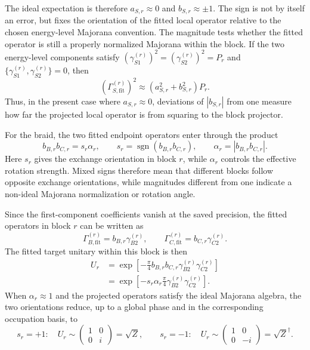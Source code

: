 The ideal expectation is therefore \(a_{S,r}\approx0\) and
\(b_{S,r}\approx\pm1\). The sign is not by itself an error, but fixes the
orientation of the fitted local operator relative to the chosen energy-level
Majorana convention. The magnitude tests whether the fitted operator is still a
properly normalized Majorana within the block. If the two energy-level
components satisfy
\((\gamma_{S1}^{(r)})^2=(\gamma_{S2}^{(r)})^2=P_r\) and
\(\{\gamma_{S1}^{(r)},\gamma_{S2}^{(r)}\}=0\), then
\begin{equation}
  \left(\Gamma_{S,\mathrm{fit}}^{(r)}\right)^2
  \approx
  \left(a_{S,r}^2+b_{S,r}^2\right)P_r .
\end{equation}
Thus, in the present case where \(a_{S,r}\approx0\), deviations of
\(|b_{S,r}|\) from one measure how far the projected local operator is from
squaring to the block projector.

For the braid, the two fitted endpoint operators enter through the product
\begin{equation}
  b_{B,r}b_{C,r}
  =
  s_r\alpha_r,
  \qquad
  s_r=\operatorname{sgn}(b_{B,r}b_{C,r}),
  \qquad
  \alpha_r=|b_{B,r}b_{C,r}|.
\end{equation}
Here \(s_r\) gives the exchange orientation in block \(r\), while
\(\alpha_r\) controls the effective rotation strength. Mixed signs therefore
mean that different blocks follow opposite exchange orientations, while
magnitudes different from one indicate a non-ideal Majorana normalization or
rotation angle.

Since the first-component coefficients vanish at the saved precision, the
fitted operators in block \(r\) can be written as
\begin{equation}
  \Gamma_{B,\mathrm{fit}}^{(r)}
  =
  b_{B,r}\gamma_{B2}^{(r)},
  \qquad
  \Gamma_{C,\mathrm{fit}}^{(r)}
  =
  b_{C,r}\gamma_{C2}^{(r)} .
\end{equation}
The fitted target unitary within this block is then
\begin{equation}
  \begin{aligned}
    U_r
    &=
    \exp\left[
      -\frac{\pi}{4}
      b_{B,r}b_{C,r}
      \gamma_{B2}^{(r)}\gamma_{C2}^{(r)}
    \right] \\
    &=
    \exp\left[
      -s_r\alpha_r\frac{\pi}{4}
      \gamma_{B2}^{(r)}\gamma_{C2}^{(r)}
    \right].
  \end{aligned}
\end{equation}
When \(\alpha_r\approx1\) and the projected operators satisfy the ideal
Majorana algebra, the two orientations reduce, up to a global phase and in the
corresponding occupation basis, to
\begin{equation}
  s_r=+1:
  \quad
  U_r\sim
  \begin{pmatrix}
    1 & 0\\
    0 & i
  \end{pmatrix}
  =
  \sqrt{Z},
  \qquad
  s_r=-1:
  \quad
  U_r\sim
  \begin{pmatrix}
    1 & 0\\
    0 & -i
  \end{pmatrix}
  =
  \sqrt{Z}^{\dagger}.
\end{equation}

